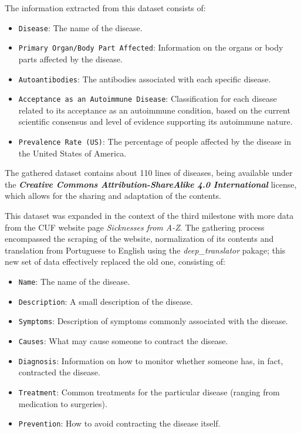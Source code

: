\documentclass[sigconf]{acmart}
\begin{document}
The information extracted from this dataset consists of:
\begin{itemize}
        \item {\texttt{Disease}}: The name of the disease.
	\item {\texttt{Primary Organ/Body Part Affected}}: Information on the organs or body parts affected by the disease.
	\item {\texttt{Autoantibodies}}: The antibodies associated with each specific disease.
	\item {\texttt{Acceptance as an Autoimmune Disease}}: Classification for each disease related to its acceptance as an autoimmune condition, based on the current scientific consensus and level of evidence supporting its autoimmune nature.
	\item {\texttt{Prevalence Rate (US)}}: The percentage of people affected by the disease in the United States of America.
\end{itemize}

The gathered dataset contains about 110 lines of diseases, being available under the \textit{\textbf{Creative Commons Attribution-ShareAlike 4.0 International}}\cite{wikipedia_cc} license, which allows for the sharing and adaptation of the contents.

This dataset was expanded in the context of the third milestone with more data from the CUF website page \textit{Sicknesses from A-Z}\cite{diseases_cuf_dataset}. The gathering process encompassed the scraping of the website, normalization of its contents and translation from Portuguese to English using the \textit{deep\_translator} pakage; this new set of data effectively replaced the old one, consisting of:
\begin{itemize}
        \item {\texttt{Name}}: The name of the disease.
	\item {\texttt{Description}}: A small description of the disease.
	\item {\texttt{Symptoms}}: Description of symptoms commonly associated with the disease.
	\item {\texttt{Causes}}: What may cause someone to contract the disease.
	\item {\texttt{Diagnosis}}: Information on how to monitor whether someone has, in fact, contracted the disease.
        \item {\texttt{Treatment}}: Common treatments for the particular
    disease (ranging from medication to surgeries).
        \item {\texttt{Prevention}}: How to avoid contracting the disease
    itself.
\end{itemize}
\end{document}
